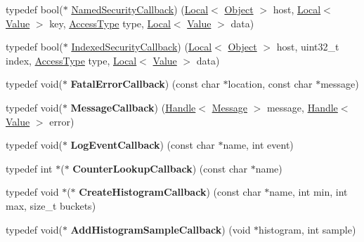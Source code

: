 \begin{DoxyCompactItemize}
\item 
typedef bool($\ast$ \hyperlink{namespacev8_ab5cafda0c556bba990c660ce9c904e0d}{Named\+Security\+Callback}) (\hyperlink{classv8_1_1_local}{Local}$<$ \hyperlink{classv8_1_1_object}{Object} $>$ host, \hyperlink{classv8_1_1_local}{Local}$<$ \hyperlink{classv8_1_1_value}{Value} $>$ key, \hyperlink{namespacev8_add8bef6469c5b94706584124e610046c}{Access\+Type} type, \hyperlink{classv8_1_1_local}{Local}$<$ \hyperlink{classv8_1_1_value}{Value} $>$ data)
\item 
typedef bool($\ast$ \hyperlink{namespacev8_aebbcc7837753e51112d944ad96520da1}{Indexed\+Security\+Callback}) (\hyperlink{classv8_1_1_local}{Local}$<$ \hyperlink{classv8_1_1_object}{Object} $>$ host, uint32\+\_\+t index, \hyperlink{namespacev8_add8bef6469c5b94706584124e610046c}{Access\+Type} type, \hyperlink{classv8_1_1_local}{Local}$<$ \hyperlink{classv8_1_1_value}{Value} $>$ data)
\item 
\hypertarget{namespacev8_abc93f69508701f18dc5cc0ce165616aa}{}typedef void($\ast$ {\bfseries Fatal\+Error\+Callback}) (const char $\ast$location, const char $\ast$message)\label{namespacev8_abc93f69508701f18dc5cc0ce165616aa}

\item 
\hypertarget{namespacev8_a26f4f3ae680876d9408a11d86f4e543d}{}typedef void($\ast$ {\bfseries Message\+Callback}) (\hyperlink{classv8_1_1_local}{Handle}$<$ \hyperlink{classv8_1_1_message}{Message} $>$ message, \hyperlink{classv8_1_1_local}{Handle}$<$ \hyperlink{classv8_1_1_value}{Value} $>$ error)\label{namespacev8_a26f4f3ae680876d9408a11d86f4e543d}

\item 
\hypertarget{namespacev8_a1516c6948fdca41f79410b7ff91aeaf0}{}typedef void($\ast$ {\bfseries Log\+Event\+Callback}) (const char $\ast$name, int event)\label{namespacev8_a1516c6948fdca41f79410b7ff91aeaf0}

\item 
\hypertarget{namespacev8_a5efca05a9f1f278a4eec832ce419104f}{}typedef int $\ast$($\ast$ {\bfseries Counter\+Lookup\+Callback}) (const char $\ast$name)\label{namespacev8_a5efca05a9f1f278a4eec832ce419104f}

\item 
\hypertarget{namespacev8_aafbf15734701792a14c02dbca7535b75}{}typedef void $\ast$($\ast$ {\bfseries Create\+Histogram\+Callback}) (const char $\ast$name, int min, int max, size\+\_\+t buckets)\label{namespacev8_aafbf15734701792a14c02dbca7535b75}

\item 
\hypertarget{namespacev8_a5a7c6bb8050ad84f0a453056ec325d1c}{}typedef void($\ast$ {\bfseries Add\+Histogram\+Sample\+Callback}) (void $\ast$histogram, int sample)\label{namespacev8_a5a7c6bb8050ad84f0a453056ec325d1c}


\end{DoxyCompactItemize}
